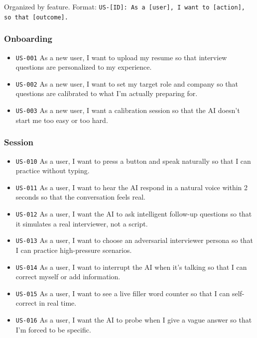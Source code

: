 \documentclass[
  11pt,
]{article}
\newcommand{\passthrough}[1]{#1}
\providecommand{\tightlist}{%
  \setlength{\itemsep}{0pt}\setlength{\parskip}{0pt}}
\begin{document}
Organized by feature. Format:
\passthrough{\lstinline!US-[ID]: As a [user], I want to [action], so that [outcome].!}

\hypertarget{onboarding}{%
\subsubsection{Onboarding}\label{onboarding}}

\begin{itemize}
\tightlist
\item
  \passthrough{\lstinline!US-001!} As a new user, I want to upload my
  resume so that interview questions are personalized to my experience.
\item
  \passthrough{\lstinline!US-002!} As a new user, I want to set my
  target role and company so that questions are calibrated to what I'm
  actually preparing for.
\item
  \passthrough{\lstinline!US-003!} As a new user, I want a calibration
  session so that the AI doesn't start me too easy or too hard.
\end{itemize}

\hypertarget{session}{%
\subsubsection{Session}\label{session}}

\begin{itemize}
\tightlist
\item
  \passthrough{\lstinline!US-010!} As a user, I want to press a button
  and speak naturally so that I can practice without typing.
\item
  \passthrough{\lstinline!US-011!} As a user, I want to hear the AI
  respond in a natural voice within 2 seconds so that the conversation
  feels real.
\item
  \passthrough{\lstinline!US-012!} As a user, I want the AI to ask
  intelligent follow-up questions so that it simulates a real
  interviewer, not a script.
\item
  \passthrough{\lstinline!US-013!} As a user, I want to choose an
  adversarial interviewer persona so that I can practice high-pressure
  scenarios.
\item
  \passthrough{\lstinline!US-014!} As a user, I want to interrupt the AI
  when it's talking so that I can correct myself or add information.
\item
  \passthrough{\lstinline!US-015!} As a user, I want to see a live
  filler word counter so that I can self-correct in real time.
\item
  \passthrough{\lstinline!US-016!} As a user, I want the AI to probe
  when I give a vague answer so that I'm forced to be specific.
\end{itemize}
\end{document}
